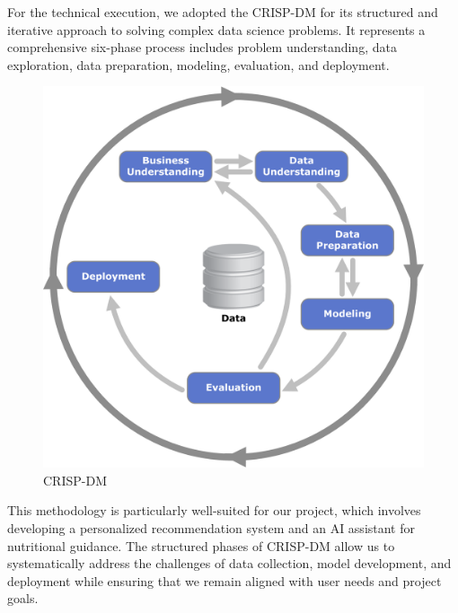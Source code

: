 For the technical execution, we adopted the CRISP-DM for its structured
and iterative approach to solving complex data science problems. It
represents a comprehensive six-phase process includes problem understanding, data exploration, data preparation, modeling, evaluation, and
deployment.
\begin{center}
\begin{figure}[H]
            \centering
            \includegraphics[scale=0.44]{images/CRISP.png}
            \caption{CRISP-DM} 
            \label{fig:CRIS-DM}
        \end{figure}
\end{center}

This methodology is particularly well-suited for our project, which involves
developing a personalized recommendation system and an AI assistant
for nutritional guidance. The structured phases of CRISP-DM allow
us to systematically address the challenges of data collection, model development, and deployment while ensuring that we remain aligned
with user needs and project goals.



